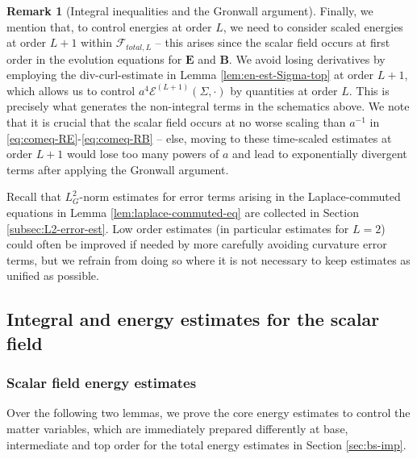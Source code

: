 \documentclass[11pt,leqno,textwidth=10cm]{amsart}
\numberwithin{equation}{section}
\theoremstyle{definition}
\newtheorem{remark}[definition]{Remark}
\theoremstyle{plain}
\newcommand{\1}{\mathbbm{1}}
\newcommand{\E}{\mathcal{E}}
\newcommand{\RE}{\bm{E}}
\newcommand{\RB}{\bm{B}}
\newcommand{\change}[1]{\color{black}#1\color{black}}
\newcommand{\delete}[1]{}
\begin{document}
\begin{remark}[Integral inequalities and the Gronwall argument]
\change{Finally, we mention that, to control energies at order $L$, we need to consider scaled energies at order $L+1$ within $\mathcal{F}_{total,L}$ -- this arises since the scalar field occurs at first order in the evolution equations for $\RE$ and $\RB$. We avoid losing derivatives by employing the div-curl-estimate in Lemma \ref{lem:en-est-Sigma-top} at order $L+1$, which allows us to control $a^4\E^{(L+1)}(\Sigma,\cdot)$ by quantities at order $L$. This is precisely what generates the non-integral terms in the schematics above. We note that it is crucial that the scalar field occurs at no worse scaling than $a^{-1}$ in \eqref{eq:comeq-RE}-\eqref{eq:comeq-RB} -- else, moving to these time-scaled estimates at order $L+1$ would lose too many powers of $a$ and lead to exponentially divergent terms after applying the Gronwall argument.}
\end{remark}
Recall that $L^2_G$-norm estimates for error terms arising in the Laplace-commuted equations in Lemma \ref{lem:laplace-commuted-eq} are collected in Section \ref{subsec:L2-error-est}. Low order estimates (in particular estimates for $L=2$) could often be improved if needed by more carefully avoiding curvature error terms, but we refrain from doing so where it is not necessary to keep estimates as unified as possible. \delete{Moreover [...]}%

\subsection{Integral and energy estimates for the scalar field}\label{subsec:en-SF}

\subsubsection{Scalar field energy estimates}\label{subsubsec:en-SF}

Over the following two lemmas, we prove the core energy estimates to control the matter variables, which are immediately prepared differently at base, intermediate and top order for the total energy estimates in Section \ref{sec:bs-imp}.
\end{document}
